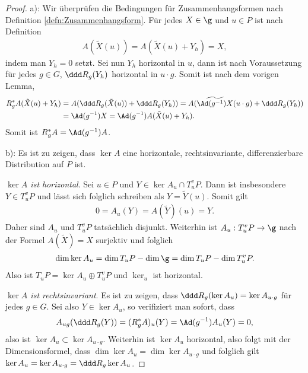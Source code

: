 \documentclass[%
	paper=a5,%
	fleqn,%
	DIV=18,%
	BCOR=0mm,
	fontsize=11pt,
	titlepage=false,%
	bibliography=totoc,
	DIV=18,%
	twoside=true,
	pdftitle=Riemannsche Geometrie,
	pdfauthor=Uwe Semmelmann,
	numbers=noendperiod]%
	{scrbook}
\begin{document}
\begin{proof}
a): Wir überprüfen die Bedingungen für Zusammenhangsformen nach Definition
\ref{defn:Zusammenhangsform}. Für jedes $X\in \g$ und $u\in P$ ist nach
Definition
\begin{align*}
A(\tilde{X}(u)) = A(\tilde{X}(u)+Y_h) = X,
\end{align*}
indem man $Y_h = 0$ setzt. Sei nun $Y_h$ horizontal in $u$, dann ist nach
Voraussetzung für jedes $g\in G$, $\ddd R_g(Y_h)$ horizontal in $u\cdot g$.
Somit ist nach dem vorigen Lemma,
\begin{align*}
R_g^* A(\tilde{X}(u)+Y_h) &= 
A(\ddd R_g (\tilde{X}(u)) + \ddd R_g (Y_h))
= A(\widetilde{\Ad(g^{-1})X}(u\cdot g) + \ddd R_g (Y_h))\\
&= \Ad(g^{-1})X
= \Ad(g^{-1})A(\tilde{X}(u) + Y_h).
\end{align*}
Somit ist $R_g^* A = \Ad(g^{-1})A$.

b): Es ist zu zeigen, dass $\ker A$ eine horizontale, rechtsinvariante,
differenzierbare Distribution auf $P$ ist.

\textit{$\ker A$ ist horizontal}. Sei $u\in P$ und $Y\in \ker A_u\cap T^v_uP$.
Dann ist insbesondere $Y\in T^v_uP$ und lässt sich folglich schreiben als
$Y=\tilde{Y}(u)$. Somit gilt
\begin{align*}
0 = A_u(Y) = A(\tilde{Y})(u) = Y.  
\end{align*}
Daher sind $A_u$ und $T^v_uP$ tatsächlich
disjunkt. Weiterhin ist $A_u: T^v_uP \to \g$ nach der Formel $A(\tilde{X}) =
X$ surjektiv und folglich
\begin{align*}
\dim \ker A_u = \dim T_uP - \dim \g = \dim T_uP - \dim T^v_uP.
\end{align*}
Also ist $T_uP = \ker A_u\oplus T^v_uP$ und $\ker_u$ ist horizontal.

\textit{$\ker A$ ist rechtsinvariant}. Es ist zu zeigen, dass $\ddd R_g(\ker
A_u) = \ker A_{u\cdot g}$ für jedes $g\in
G$. Sei also $Y\in \ker A_u$, so verifiziert man sofort, dass
\begin{align*}
A_{ug}(\ddd R_g(Y)) = (R_g^* A)_u(Y)
= \Ad(g^{-1})A_u(Y) = 0,
\end{align*}
also ist $\ker A_u \subset \ker A_{u\cdot g}$. Weiterhin ist $\ker A_u$
horizontal, also folgt mit der Dimensionsformel, dass $\dim \ker A_u = \dim
\ker A_{u\cdot g}$ und folglich gilt $\ker A_u = \ker A_{u\cdot g} = \ddd
R_{g} \ker A_u$.


\end{proof}
\end{document}
